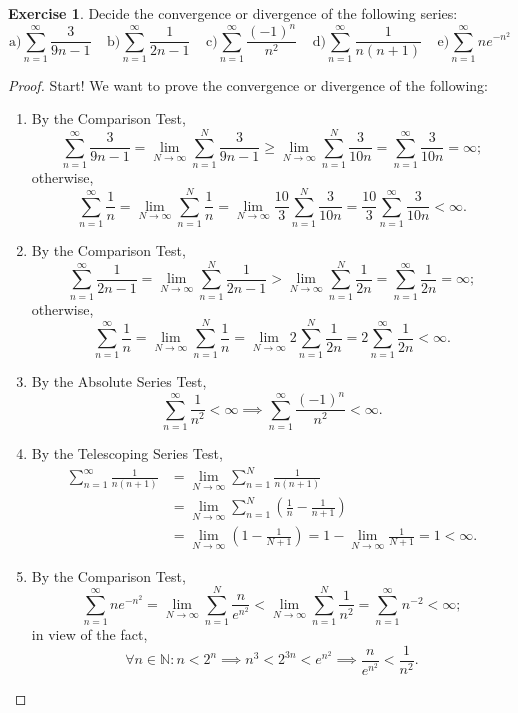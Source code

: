 \documentclass[12pt]{article}
\theoremstyle{definition}
\newtheorem{exercise}{Exercise}
\begin{document}
\thispagestyle{firstpage}

\begin{exercise}
    Decide the convergence or divergence of the following series:
    \[
        \text{a}) \sum_{n = 1}^{\infty}\frac{3}{9n - 1} \ \ \ \ \ \text{b}) \sum_{n = 1}^{\infty}\frac{1}{2n - 1} \ \ \ \ \ \text{c}) \sum_{n = 1}^{\infty}\frac{(-1)^n}{n^2} \ \ \ \ \ \text{d}) \sum_{n = 1}^{\infty}\frac{1}{n(n + 1)} \ \ \ \ \ \text{e}) \sum_{n = 1}^{\infty}ne^{-n^2}
    \]
\end{exercise}

\begin{proof}
    Start! We want to prove the convergence or divergence of the following:
    \begin{enumerate}[label=\alph*)]
        \item By the Comparison Test,
        \[
            \sum_{n = 1}^{\infty}\frac{3}{9n - 1} = \lim_{N \to \infty}\sum_{n = 1}^{N}\frac{3}{9n - 1} \geq \lim_{N \to \infty}\sum_{n = 1}^{N}\frac{3}{10n} = \sum_{n = 1}^{\infty}\frac{3}{10n} = \infty;
        \]
        otherwise,
        \[
            \sum_{n = 1}^{\infty}\frac{1}{n} = \lim_{N \to \infty}\sum_{n = 1}^{N}\frac{1}{n} = \lim_{N \to \infty}\frac{10}{3}\sum_{n = 1}^{N}\frac{3}{10n} = \frac{10}{3}\sum_{n = 1}^{\infty}\frac{3}{10n} < \infty.
        \]
        \item By the Comparison Test,
        \[
            \sum_{n = 1}^{\infty}\frac{1}{2n - 1} = \lim_{N \to \infty}\sum_{n = 1}^{N}\frac{1}{2n - 1} > \lim_{N \to \infty}\sum_{n = 1}^{N}\frac{1}{2n} = \sum_{n = 1}^{\infty}\frac{1}{2n} = \infty;
        \]
        otherwise,
        \[
            \sum_{n = 1}^{\infty}\frac{1}{n} = \lim_{N \to \infty}\sum_{n = 1}^{N}\frac{1}{n} = \lim_{N \to \infty}2\sum_{n = 1}^{N}\frac{1}{2n} = 2\sum_{n = 1}^{\infty}\frac{1}{2n} < \infty.
        \]
        \item By the Absolute Series Test,
        \[
            \sum_{n = 1}^{\infty}\frac{1}{n^2} < \infty \implies \sum_{n = 1}^{\infty}\frac{(-1)^n}{n^2} < \infty.
        \]
        \item By the Telescoping Series Test,
        \begin{align*}
            \sum_{n = 1}^{\infty}\frac{1}{n(n + 1)} &= \lim_{N \to \infty}\sum_{n = 1}^{N}\frac{1}{n(n + 1)} \\
            &= \lim_{N \to \infty}\sum_{n = 1}^{N}\left(\frac{1}{n} - \frac{1}{n + 1}\right) \\
            &= \lim_{N \to \infty}\left(1 - \frac{1}{N + 1}\right) = 1 - \lim_{N \to \infty}\frac{1}{N + 1} = 1 < \infty.
        \end{align*}
        \item By the Comparison Test,
        \[
            \sum_{n = 1}^{\infty}ne^{-n^2} = \lim_{N \to \infty}\sum_{n = 1}^{N}\frac{n}{e^{n^2}} < \lim_{N \to \infty}\sum_{n = 1}^{N}\frac{1}{n^2} = \sum_{n = 1}^{\infty}n^{-2} < \infty;
        \]
        in view of the fact,
        \[
            \forall n \in \mathbb{N} : n < 2^n \implies n^3 < 2^{3n} < e^{n^2} \implies \frac{n}{e^{n^2}} < \frac{1}{n^2}.
        \]
    \end{enumerate}
\end{proof}
\end{document}
